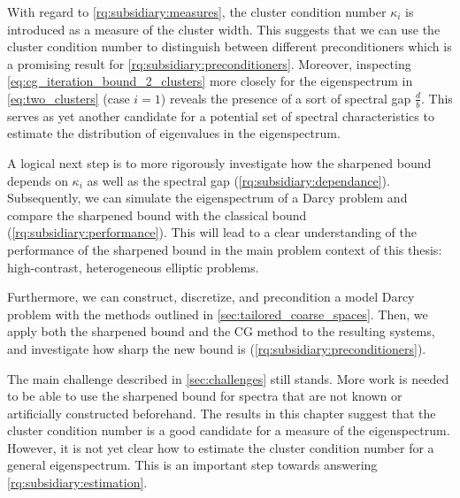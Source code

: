 With regard to \ref{rq:subsidiary:measures}, the cluster condition number $\kappa_i$ is introduced as a measure of the cluster width. This suggests that we can use the cluster condition number to distinguish between different preconditioners which is a promising result for \ref{rq:subsidiary:preconditioners}. Moreover, inspecting \cref{eq:cg_iteration_bound_2_clusters} more closely for the eigenspectrum in \cref{eq:two_clusters} (case $i=1$) reveals the presence of a sort of spectral gap $\frac{d}{b}$. This serves as yet another candidate for a potential set of spectral characteristics to estimate the distribution of eigenvalues in the eigenspectrum.

A logical next step is to more rigorously investigate how the sharpened bound depends on $\kappa_i$ as well as the spectral gap (\ref{rq:subsidiary:dependance}). Subsequently, we can simulate the eigenspectrum of a Darcy problem and compare the sharpened bound with the classical bound (\ref{rq:subsidiary:performance}). This will lead to a clear understanding of the performance of the sharpened bound in the main problem context of this thesis: high-contrast, heterogeneous elliptic problems.

Furthermore, we can construct, discretize, and precondition a model Darcy problem with the methods outlined in \cref{sec:tailored_coarse_spaces}. Then, we apply both the sharpened bound and the CG method to the resulting systems, and investigate how sharp the new bound is (\ref{rq:subsidiary:preconditioners}).

The main challenge described in \cref{sec:challenges} still stands. More work is needed to be able to use the sharpened bound for spectra that are not known or artificially constructed beforehand. The results in this chapter suggest that the cluster condition number is a good candidate for a measure of the eigenspectrum. However, it is not yet clear how to estimate the cluster condition number for a general eigenspectrum. This is an important step towards answering \ref{rq:subsidiary:estimation}.